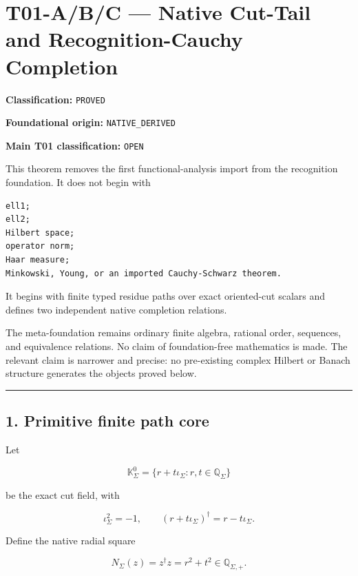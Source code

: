 \hypertarget{t01-abc-native-cut-tail-and-recognition-cauchy-completion}{%
\chapter{T01-A/B/C --- Native Cut-Tail and Recognition-Cauchy Completion}\label{t01-abc-native-cut-tail-and-recognition-cauchy-completion}}

\textbf{Classification:} \texttt{PROVED}

\textbf{Foundational origin:} \texttt{NATIVE\_DERIVED}

\textbf{Main T01 classification:} \texttt{OPEN}

This theorem removes the first functional-analysis import from the recognition
foundation. It does not begin with

\begin{verbatim}
ell1;
ell2;
Hilbert space;
operator norm;
Haar measure;
Minkowski, Young, or an imported Cauchy-Schwarz theorem.
\end{verbatim}

It begins with finite typed residue paths over exact oriented-cut scalars and
defines two independent native completion relations.

The meta-foundation remains ordinary finite algebra, rational order, sequences,
and equivalence relations. No claim of foundation-free mathematics is made.
The relevant claim is narrower and precise: no pre-existing complex Hilbert or
Banach structure generates the objects proved below.

\begin{center}\rule{0.5\linewidth}{0.5pt}\end{center}

\hypertarget{primitive-finite-path-core}{%
\section{1. Primitive finite path core}\label{primitive-finite-path-core}}

Let

\[
\mathbb K_\Sigma^0
=
\{r+t\iota_\Sigma:r,t\in\mathbb Q_\Sigma\}
\]

be the exact cut field, with

\[
\iota_\Sigma^2=-1,
\qquad
(r+t\iota_\Sigma)^\dagger=r-t\iota_\Sigma.
\]

Define the native radial square

\[
N_\Sigma(z)=z^\dagger z=r^2+t^2
\in\mathbb Q_{\Sigma,+}.
\tag{1.1}
\]

